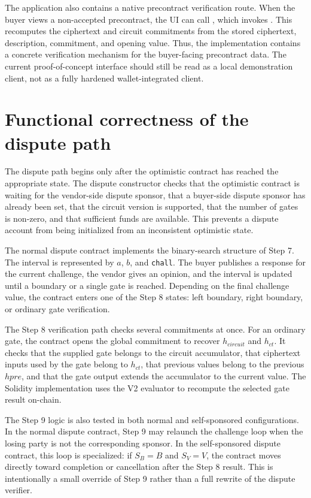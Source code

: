 The application also contains a native precontract verification route. When the buyer views
a non-accepted precontract, the UI can call , which invokes
. This recomputes the ciphertext and circuit commitments from
the stored ciphertext, description, commitment, and opening value. Thus, the implementation
contains a concrete verification mechanism for the buyer-facing precontract data. The
current proof-of-concept interface should still be read as a local demonstration client, not
as a fully hardened wallet-integrated client.

\section{Functional correctness of the dispute path}

The dispute path begins only after the optimistic contract has reached the appropriate
state. The dispute constructor checks that the optimistic contract is waiting for the
vendor-side dispute sponsor, that a buyer-side dispute sponsor has already been set, that
the circuit version is supported, that the number of gates is non-zero, and that sufficient
funds are available. This prevents a dispute account from being initialized from an
inconsistent optimistic state.

The normal dispute contract implements the binary-search structure of Step 7. The interval
is represented by \(a\), \(b\), and \texttt{chall}. The buyer publishes a response for the
current challenge, the vendor gives an opinion, and the interval is updated until a boundary
or a single gate is reached. Depending on the final challenge value, the contract enters one
of the Step 8 states: left boundary, right boundary, or ordinary gate verification.

The Step 8 verification path checks several commitments at once. For an ordinary gate, the
contract opens the global commitment to recover \(h_{\mathit{circuit}}\) and
\(h_{\mathit{ct}}\). It checks that the supplied gate belongs to the circuit accumulator,
that ciphertext inputs used by the gate belong to \(h_{\mathit{ct}}\), that previous values
belong to the previous \(hpre\), and that the gate output extends the accumulator to the
current value. The Solidity implementation uses the V2 evaluator to recompute the selected
gate result on-chain.

The Step 9 logic is also tested in both normal and self-sponsored configurations. In the
normal dispute contract, Step 9 may relaunch the challenge loop when the losing party is not
the corresponding sponsor. In the self-sponsored dispute contract, this loop is specialized:
if \(S_B=B\) and \(S_V=V\), the contract moves directly toward completion or cancellation
after the Step 8 result. This is intentionally a small override of Step 9 rather than a full
rewrite of the dispute verifier.

